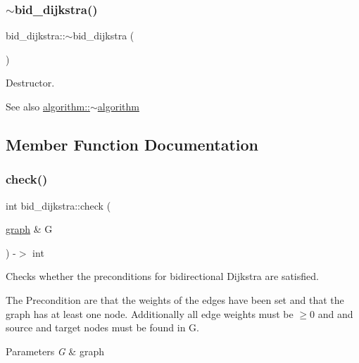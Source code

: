 \subsubsection{\texorpdfstring{$\sim$bid\+\_\+dijkstra()}{~bid\_dijkstra()}}
{\footnotesize\ttfamily bid\+\_\+dijkstra\+::$\sim$bid\+\_\+dijkstra (\begin{DoxyParamCaption}{ }\end{DoxyParamCaption})\hspace{0.3cm}{\ttfamily [virtual]}}



Destructor. 

\begin{DoxySeeAlso}{See also}
\mbox{\hyperlink{classalgorithm_adca9b1e7fa3afd914519a9dbb44e9fd5}{algorithm\+::$\sim$algorithm}} 
\end{DoxySeeAlso}


\subsection{Member Function Documentation}
\mbox{\label{classbid__dijkstra_a908a240370d578fbd6bf54b4ab09d391}} 
\subsubsection{\texorpdfstring{check()}{check()}}
{\footnotesize\ttfamily int bid\+\_\+dijkstra\+::check (\begin{DoxyParamCaption}\item[{\mbox{\hyperlink{classgraph}{graph}} \&}]{G }\end{DoxyParamCaption}) -\/$>$ int\hspace{0.3cm}{\ttfamily [virtual]}}



Checks whether the preconditions for bidirectional Dijkstra are satisfied. 

The Precondition are that the weights of the edges have been set and that the graph has at least one node. Additionally all edge weights must be $\ge 0$ and and source and target nodes must be found in {\ttfamily G}.


\begin{DoxyParams}{Parameters}
{\em G} & graph\\
\hline
\end{DoxyParams}

